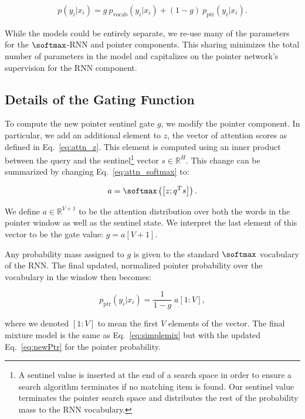 \begin{align} \label{eq:simplemix}
p(y_i|x_i) = g~p_{\text{vocab}}(y_i|x_i) + (1 - g)~p_{\text{ptr}}(y_i|x_i).
\end{align}

While the models could be entirely separate, we re-use many of the parameters for the $\softmax$-RNN and pointer components. This sharing minimizes the total number of parameters in the model and capitalizes on the pointer network's supervision for the RNN component.

\subsection{Details of the Gating Function} To compute the new pointer sentinel gate $g$, we modify the pointer component. In particular, we add an additional element to $z$, the vector of attention scores as defined in Eq.~\ref{eq:attn_z}. This element is computed using an inner product between the query and the sentinel\footnote{A sentinel value is inserted at the end of a search space in order to ensure a search algorithm terminates if no matching item is found. Our sentinel value terminates the pointer search space and distributes the rest of the probability mass to the RNN vocabulary.} vector $s \in \mathbb{R}^{H}$. This change can be summarized by changing Eq.~\ref{eq:attn_softmax} to:

\begin{equation}
a = \softmax \left( \left[z ; q^Ts\right] \right).
\end{equation}

We define $a \in \mathbb{R}^{V+1}$ to be the attention distribution over both the words in the pointer window as well as the sentinel state. We interpret the last element of this vector to be the gate value: $g = a[V+1]$. 

Any probability mass assigned to $g$ is given to the standard $\softmax$ vocabulary of the RNN. The final updated, normalized pointer probability over the vocabulary in the window then becomes:

\begin{equation}\label{eq:newPtr}
p_{\text{ptr}}(y_i|x_i) = \frac{1}{1 - g} \; a[1:V],
\end{equation}

where we denoted $[1:V]$ to mean the first $V$ elements of the vector. The final mixture model is the same as Eq.~\ref{eq:simplemix} but with the updated Eq.~\ref{eq:newPtr} for the pointer probability.

